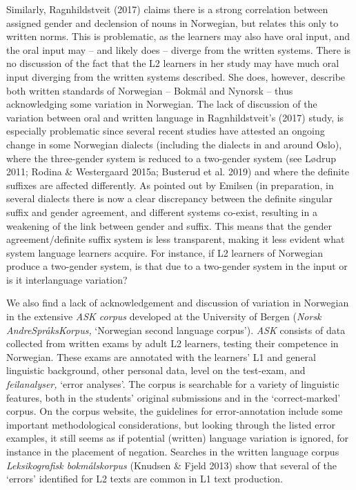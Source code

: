 \documentclass[12pt]{article}
\newenvironment{styleStandard}{\renewcommand\baselinestretch{1.0}\setlength\leftskip{0cm}\setlength\rightskip{0cm plus 1fil}\setlength\parindent{0cm}\setlength\parfillskip{0pt plus 1fil}\setlength\parskip{0in plus 1pt}\writerlistparindent\writerlistleftskip\leavevmode\normalfont\normalsize\writerlistlabel\ignorespaces}{\unskip\vspace{0in plus 1pt}\par}
\newcommand\writerlistleftskip{}
\newcommand\writerlistparindent{}
\newcommand\writerlistlabel{}
\begin{document}
\begin{styleStandard}
Similarly, Ragnhildstveit (2017) claims there is a strong correlation between assigned gender and declension of nouns in Norwegian, but relates this only to written norms. This is problematic, as the learners may also have oral input, and the oral input may – and likely does – diverge from the written systems. There is no discussion of the fact that the L2 learners in her study may have much oral input diverging from the written systems described. She does, however, describe both written standards of Norwegian – Bokmål and Nynorsk – thus acknowledging some variation in Norwegian. The lack of discussion of the variation between oral and written language in Ragnhildstveit’s (2017) study, is especially problematic since several recent studies have attested an ongoing change in some Norwegian dialects (including the dialects in and around Oslo), where the three-gender system is reduced to a two-gender system (see Lødrup 2011; Rodina \& Westergaard 2015a; Busterud et al. 2019) and where the definite suffixes are affected differently. As pointed out by Emilsen (in preparation, in several dialects there is now a clear discrepancy between the definite singular suffix and gender agreement, and different systems co-exist, resulting in a weakening of the link between gender and suffix. This means that the gender agreement/definite suffix system is less transparent, making it less evident what system language learners acquire. For instance, if L2 learners of Norwegian produce a two-gender system, is that due to a two-gender system in the input or is it interlanguage variation?
\end{styleStandard}

\begin{styleStandard}
We also find a lack of acknowledgement and discussion of variation in Norwegian in the extensive \textit{ASK corpus} developed at the University of Bergen (\textit{Norsk AndreSpråksKorpus, }‘Norwegian second language corpus’). \textit{ASK} consists of data collected from written exams by adult L2 learners, testing their competence in Norwegian. These exams are annotated with the learners’ L1 and general linguistic background, other personal data, level on the test-exam, and \textit{feilanalyser,} ‘error analyses’. The corpus is searchable for a variety of linguistic features, both in the students’ original submissions and in the ‘correct-marked’ corpus. On the corpus website, the guidelines for error-annotation include some important methodological considerations, but looking through the listed error examples, it still seems as if potential (written) language variation is ignored, for instance in the placement of negation. Searches in the written language corpus \textit{Leksikografisk bokmålskorpus} (Knudsen \& Fjeld 2013) show that several of the ‘errors’ identified for L2 texts are common in L1 text production. \ 
\end{styleStandard}
\end{document}
